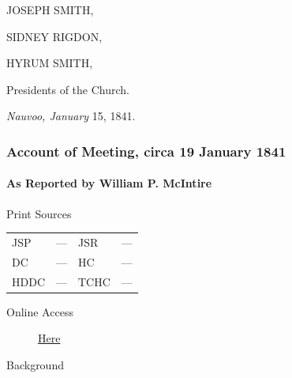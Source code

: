				\begin{tightright}
					JOSEPH SMITH,

					SIDNEY RIGDON,

					HYRUM SMITH,

					Presidents of the Church.
				\end{tightright}

				\textit{Nauvoo, January} 15, 1841.
				
		\subsubsection{Account of Meeting, circa 19 January 1841}
			\label{EMS-1841-JS-CIR-19-JAN-1841}
			
			\paragraph{As Reported by William P. McIntire}
				\label{EMS-1841-JS-CIR-19-JAN-1841-WM}
			
				\begin{description}
					\item[Print Sources]
				\end{description}

				\begin{tabular}{p{0.5in}p{1in}p{0.5in}p{1in}}
					JSP	 	& ---		& JSR 		& --- \\
					DC	 	& ---		& HC 		& --- \\
					HDDC 	& ---		& TCHC 		& --- \\
				\end{tabular}
				
				\begin{description}
					\item[Online Access] \href{https://www.josephsmithpapers.org/paper-summary/account-of-meeting-circa-19-january-1841-as-reported-by-william-p-mcintire/1}{Here}
				\end{description}
				
				\begin{description}
					\item[Background]
				\end{description}
				
				
